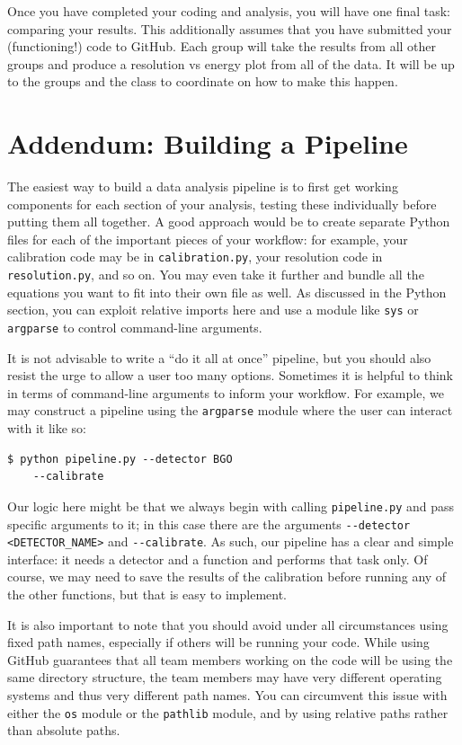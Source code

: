 \documentclass{tufte-book}
\begin{document}
Once you have completed your coding and analysis, you will have one final task: comparing your results. This additionally assumes that you have submitted your (functioning!) code to GitHub. Each group will take the results from all other groups and produce a resolution vs energy plot from all of the data. It will be up to the groups and the class to coordinate on how to make this happen.

\section{Addendum: Building a Pipeline}
\label{sec:he-addendum}

The easiest way to build a data analysis pipeline is to first get working components for each section of your analysis, testing these individually before putting them all together. A good approach would be to create separate Python files for each of the important pieces of your workflow: for example, your calibration code may be in \verb|calibration.py|, your resolution code in \verb|resolution.py|, and so on. You may even take it further and bundle all the equations you want to fit into their own file as well. As discussed in the Python section, you can exploit {relative imports} here and use a module like \verb|sys| or \verb|argparse| to control command-line arguments.

It is not advisable to write a ``do it all at once'' pipeline, but you should also resist the urge to allow a user too many options. Sometimes it is helpful to think in terms of command-line arguments to inform your workflow. For example, we may construct a pipeline using the \verb|argparse| module where the user can interact with it like so:

\begin{lstlisting}[backgroundcolor=\color{lightgray}, breaklines=true]
$ python pipeline.py --detector BGO 
    --calibrate
\end{lstlisting}

Our logic here might be that we always begin with calling \verb|pipeline.py| and pass specific arguments to it; in this case there are the arguments \verb|--detector <DETECTOR_NAME>| and \verb|--calibrate|. As such, our pipeline has a clear and simple interface: it needs a detector and a function and performs that task only. Of course, we may need to save the results of the calibration before running any of the other functions, but that is easy to implement. 

It is also important to note that you should avoid under all circumstances using fixed path names, especially if others will be running your code. While using GitHub guarantees that all team members working on the code will be using the same directory structure, the team members may have very different operating systems and thus very different path names. You can circumvent this issue with either the \verb|os| module or the \verb|pathlib| module, and by using relative paths rather than absolute paths.
\end{document}
